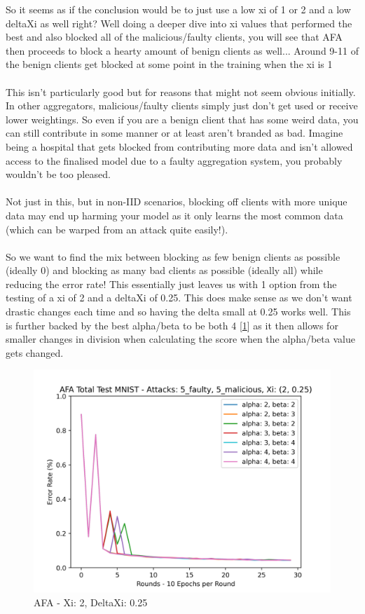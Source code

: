 So it seems as if the conclusion would be to just use a low xi of 1 or 2 and a low deltaXi as well right? 
Well doing a deeper dive into xi values that performed the best and also blocked all of the malicious/faulty clients, you will see that AFA then proceeds to block a hearty amount of benign clients as well...
Around 9-11 of the benign clients get blocked at some point in the training when the xi is 1
\\ \\
This isn't particularly good but for reasons that might not seem obvious initially. 
In other aggregators, malicious/faulty clients simply just don't get used or receive lower weightings. 
So even if you are a benign client that has some weird data, you can still contribute in some manner or at least aren't branded as bad. 
Imagine being a hospital that gets blocked from contributing more data and isn't allowed access to the finalised model due to a faulty aggregation system, you probably wouldn't be too pleased.
\\ \\
Not just in this, but in non-IID scenarios, blocking off clients with more unique data may end up harming your model as it only learns the most common data (which can be warped from an attack quite easily!).
\\ \\
So we want to find the mix between blocking as few benign clients as possible (ideally 0) and blocking as many bad clients as possible (ideally all) while reducing the error rate! 
This essentially just leaves us with 1 option from the testing of a xi of 2 and a deltaXi of 0.25.
This does make sense as we don't want drastic changes each time and so having the delta small at 0.25 works well. 
This is further backed by the best alpha/beta to be both 4 [\ref{fig:best_afa}] as it then allows for smaller changes in division when calculating the score when the alpha/beta value gets changed.

\begin{figure}[htbp]
	\centering
    \includegraphics[scale=0.7]{initial/graphs/best_afa.png}
	\caption{AFA - Xi: 2, DeltaXi: 0.25}
	\label{fig:best_afa}
\end{figure}


